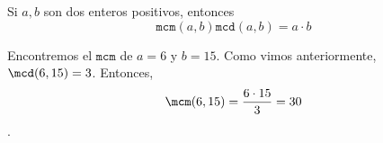 	\begin{proposicion}
		\label{prop:mcm}
		Si $a,b$ son dos enteros positivos, entonces
		$$
		\texttt{mcm}(a,b)\texttt{mcd}(a,b)= a\cdot b
		$$
	\end{proposicion}

	\begin{ejemplo}
		\label{exmp:mcm}
		Encontremos el $\texttt{mcm}$ de $a=6$ y $b=15.$
		Como vimos anteriormente, $ \mcd(6,15)=3 $. Entonces, 
		\[ \mcm(6,15)=\dfrac{6\cdot15}{3}= 30 \].
	\end{ejemplo}


